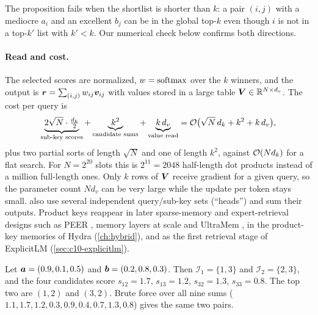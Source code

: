 The proposition fails when the shortlist is shorter than $k$: a pair $(i,j)$ with a mediocre $a_i$
and an excellent $b_j$ can be in the global top-$k$ even though $i$ is not in a top-$k'$ list with
$k' < k$. Our numerical check below confirms both directions.

\paragraph{Read and cost.} The selected scores are normalized, $w = \operatorname{softmax}$ over the $k$
winners, and the output is $\bm{r} = \sum_{(i,j)} w_{ij} \bm{v}_{ij}$ with values stored in a large
table $\bm{V} \in \mathbb{R}^{N \times d_v}$. The cost per query is
\begin{equation}
  \underbrace{2\sqrt{N}\cdot \tfrac{d_k}{2}}_{\text{sub-key scores}}
  + \underbrace{k^2}_{\text{candidate sums}}
  + \underbrace{k\, d_v}_{\text{value read}}
  = \mathcal{O}\bigl(\sqrt{N}\, d_k + k^2 + k\, d_v\bigr),
\end{equation}
plus two partial sorts of length $\sqrt{N}$ and one of length $k^2$, against $\mathcal{O}(N d_k)$ for a
flat search. For $N = 2^{20}$ slots this is $2^{11} = 2048$ half-length dot products instead of a
million full-length ones. Only $k$ rows of $\bm{V}$ receive gradient for a given query, so the
parameter count $N d_v$ can be very large while the update per token stays small.
\citet{c10-lample2019pkm} also use several independent query/sub-key sets (``heads'') and sum
their outputs. Product keys reappear in later sparse-memory and expert-retrieval designs such as
PEER \citep{c10-he2024peer}, memory layers at scale \citep{c10-berges2025memorylayers} and
UltraMem \citep{c10-huang2025ultramem}, in the product-key memories of Hydra
\citep{chaudhary2025hydra} (\cref{ch:hybrid}), and as the first retrieval stage of ExplicitLM
(\cref{sec:c10-explicitlm}).

\begin{example}[$N = 9$, $k = 2$]\label{ex:c10-pkm}
Let $\bm{a} = (0.9, 0.1, 0.5)$ and $\bm{b} = (0.2, 0.8, 0.3)$. Then $\mathcal{I}_1 = \{1, 3\}$ and
$\mathcal{I}_2 = \{2, 3\}$, and the four candidates score $s_{12} = 1.7$, $s_{13} = 1.2$,
$s_{32} = 1.3$, $s_{33} = 0.8$. The top two are $(1,2)$ and $(3,2)$. Brute force over all nine
sums ($1.1, 1.7, 1.2, 0.3, 0.9, 0.4, 0.7, 1.3, 0.8$) gives the same two pairs.
\end{example}

